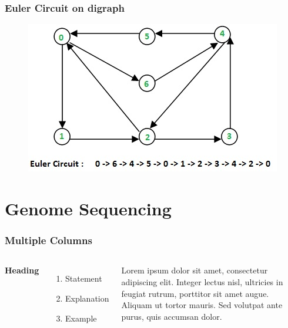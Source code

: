 \documentclass{beamer}
\begin{document}

\begin{frame}
\frametitle{Euler Circuit on digraph}
\begin{figure}[h]
\includegraphics[scale = 0.8]{eulerdi.jpg}
\end{figure}
\end{frame}




\section{Genome Sequencing}


\begin{frame}
\frametitle{Multiple Columns}
\begin{columns}[c] %

\textbf{Heading}
\begin{enumerate}
\item Statement
\item Explanation
\item Example
\end{enumerate}

Lorem ipsum dolor sit amet, consectetur adipiscing elit. Integer lectus nisl, ultricies in feugiat rutrum, porttitor sit amet augue. Aliquam ut tortor mauris. Sed volutpat ante purus, quis accumsan dolor.

\end{columns}
\end{frame}
\end{document}
